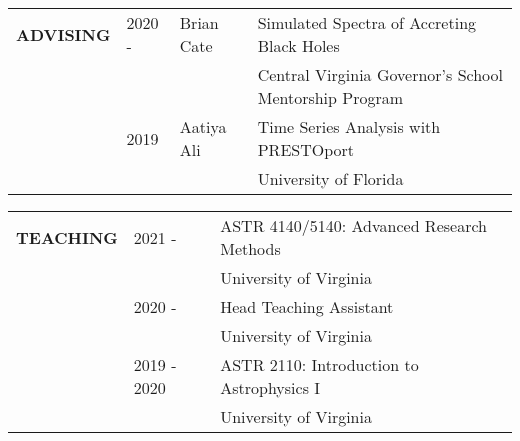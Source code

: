 \documentclass{article}
\begin{document}
\begin{tabular}{p{4cm}p{2.2cm}ll}
    \large{\textbf{ADVISING}} & 2020 - & Brian Cate & Simulated Spectra of Accreting Black Holes\\
     & & & \small Central Virginia Governor's School Mentorship Program \vspace{0.125cm}\\
    & 2019 & Aatiya Ali & Time Series Analysis with PRESTOport \\
     & & & \small University of Florida
\end{tabular}
\vspace{0.5cm}


\begin{tabular}{p{4cm}p{2.2cm}l}
    \large{\textbf{TEACHING}} & 2021 - & ASTR 4140/5140: Advanced Research Methods \\
    & & \small University of Virginia \vspace{0.125cm}\\
    & 2020 -& Head Teaching Assistant \\
    & & \small University of Virginia \vspace{0.125cm}\\
    & 2019 - 2020 & ASTR 2110: Introduction to Astrophysics I \\
    & & \small University of Virginia \vspace{0.125cm}\\
\end{tabular}
\vspace{0.5cm}
\end{document}
